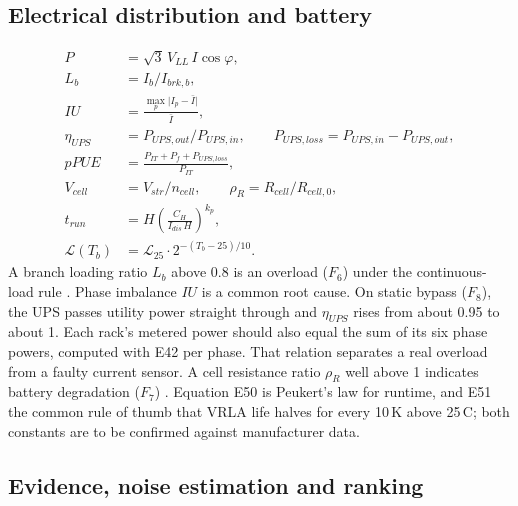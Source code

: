 \subsection{Electrical distribution and battery}

\begin{align}
  P &= \sqrt{3}\, V_{LL}\, I \cos\varphi , \tag{E42}\\
  L_b &= I_b / I_{brk,b} , \tag{E43}\\
  \mathit{IU} &= \frac{\max_{p} \lvert I_p - \bar I \rvert}{\bar I} , \tag{E44}\\
  \eta_{UPS} &= P_{UPS,out} / P_{UPS,in} , \qquad P_{UPS,loss} = P_{UPS,in} - P_{UPS,out} , \tag{E45--E46}\\
  \mathit{pPUE} &= \frac{P_{IT} + P_f + P_{UPS,loss}}{P_{IT}} , \tag{E47}\\
  V_{cell} &= V_{str} / n_{cell} , \qquad \rho_R = R_{cell} / R_{cell,0} , \tag{E48--E49}\\
  t_{run} &= H \left(\frac{C_H}{I_{dis}\, H}\right)^{k_p} , \tag{E50}\\
  \mathcal{L}(T_b) &= \mathcal{L}_{25} \cdot 2^{-(T_b - 25)/10} . \tag{E51}
\end{align}
A branch loading ratio $L_b$ above 0.8 is an overload ($F_6$) under the continuous-load rule \parencite{nfpa702023}. Phase imbalance $\mathit{IU}$ is a common root cause. On static bypass ($F_8$), the UPS passes utility power straight through and $\eta_{UPS}$ rises from about 0.95 to about 1. Each rack's metered power should also equal the sum of its six phase powers, computed with E42 per phase. That relation separates a real overload from a faulty current sensor. A cell resistance ratio $\rho_R$ well above 1 indicates battery degradation ($F_7$) \parencite{ieee1188}. Equation E50 is Peukert's law for runtime, and E51 the common rule of thumb that VRLA life halves for every 10\,K above 25\,\textdegree C; both constants are to be confirmed against manufacturer data.

\subsection{Evidence, noise estimation and ranking}


